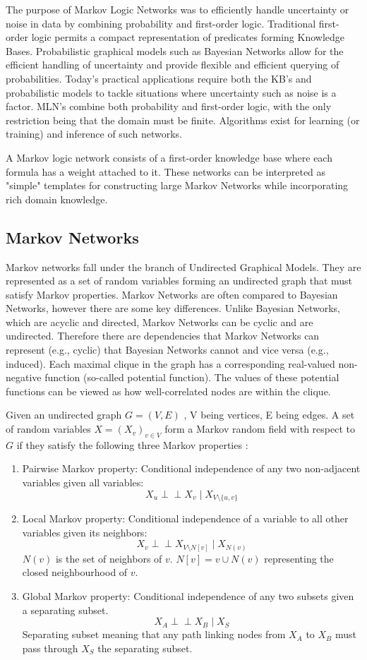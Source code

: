 The purpose of Markov Logic Networks was to efficiently handle uncertainty or noise in data by combining probability and first-order logic. Traditional first-order logic permits a compact representation of predicates forming Knowledge Bases. Probabilistic graphical models such as Bayesian Networks allow for the efficient handling of uncertainty and provide flexible and efficient querying of probabilities. Today's practical applications require both the KB's and probabilistic models to tackle situations where uncertainty such as noise is a factor. MLN's combine both probability and first-order logic, with the only restriction being that the domain must be finite. Algorithms exist for learning (or training) and inference of such networks.

A Markov logic network consists of a first-order knowledge base where each formula has a weight attached to it. These networks can be interpreted as "simple" templates for constructing large Markov Networks while incorporating rich domain knowledge.

\subsection{Markov Networks}
Markov networks fall under the branch of Undirected Graphical Models.
They are represented as a set of random variables forming an undirected graph that must satisfy Markov properties. Markov Networks are often compared to Bayesian Networks, however there are some key differences. Unlike Bayesian Networks, which are acyclic and directed, Markov Networks can be cyclic and are undirected. Therefore there are dependencies that Markov Networks can represent (e.g., cyclic) that Bayesian Networks cannot and vice versa (e.g., induced).
Each maximal clique in the graph has a corresponding real-valued non-negative function (so-called potential function). The values of these potential functions can be viewed as how well-correlated nodes are within the clique.

Given an undirected graph \(G = (V,E)\) , V being vertices, E being edges.
A set of random variables \(X = (X_v)_{v\in V}\) form a Markov random field with respect to \(G\) if they satisfy the following three Markov properties \cite{Markovra75:online}:
\begin{enumerate}
    \item Pairwise Markov property: Conditional independence of any two non-adjacent variables given all variables: \[X_u \perp\!\!\!\perp X_v \mid X_{V\setminus\{u,v\}}\]
    \item Local Markov property: Conditional independence of a variable to all other variables given its neighbors: \[ X_v \perp \!\!\!\perp X_{V\setminus N[v]} \mid X_{N(v)}\] \(N(v)\)  is the set of neighbors of \(v\). \newline\(N[v] = v\cup N(v)\) representing the closed neighbourhood of \(v\).
    \item Global Markov property: Conditional independence of any two subsets given a separating subset.
    \[X_A \perp \!\!\!\perp X_B \mid X_S \]Separating subset meaning that any path linking nodes from \(X_A\) to \(X_B\) must pass through \(X_S\) the separating subset.
\end{enumerate}

